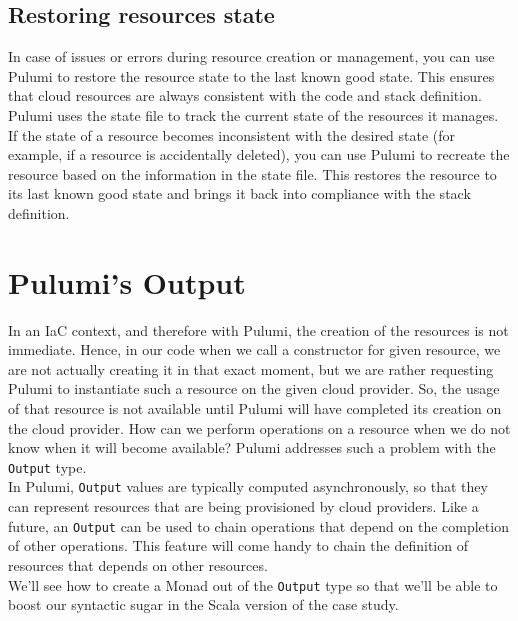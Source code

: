 \subsection{Restoring resources state}
In case of issues or errors during resource creation or management, you can use Pulumi to restore the resource state to the last known good state.
This ensures that cloud resources are always consistent with the code and stack definition.\\
Pulumi uses the state file to track the current state of the resources it manages.
If the state of a resource becomes inconsistent with the desired state (for example, if a resource is accidentally deleted), you can use Pulumi to recreate the resource based on the information in the state file.
This restores the resource to its last known good state and brings it back into compliance with the stack definition.

\section{Pulumi's Output}
In an IaC context, and therefore with Pulumi, the creation of the resources is not immediate.
Hence, in our code when we call a constructor for given resource, we are not actually creating it in that exact moment, but we are rather requesting Pulumi to instantiate such a resource on the given cloud provider.
So, the usage of that resource is not available until Pulumi will have completed its creation on the cloud provider.
How can we perform operations on a resource when we do not know when it will become available?
Pulumi addresses such a problem with the \texttt{Output} type.\\
In Pulumi, \texttt{Output} values are typically computed asynchronously, so that they can represent resources that are being provisioned by cloud providers.
Like a future, an \texttt{Output} can be used to chain operations that depend on the completion of other operations.
This feature will come handy to chain the definition of resources that depends on other resources.\\
We'll see how to create a Monad out of the \texttt{Output} type so that we'll be able to boost our syntactic sugar in the Scala version of the case study.
